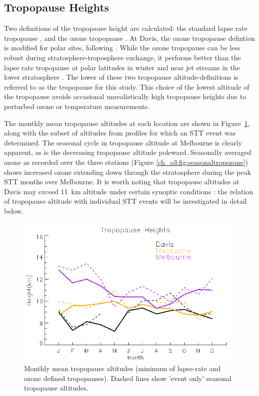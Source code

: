   \subsection{Tropopause Heights}
    Two definitions of the tropopause height are calculated: the standard lapse rate tropopause \citep{WMO1957}, and the ozone tropopause \citep{Bethan1996}.
    At Davis, the ozone tropopause defintion is modified for polar sites, following \citet{Tomikawa2009,Alexander2013}. 
    While the ozone tropopause can be less robust during stratosphere-troposphere exchange, it performs better than the lapse rate tropopause at polar latitudes in winter and near jet streams in the lower stratosphere \citep{Bethan1996}. The lower of these two tropopause altitude-definitions is referred to as the tropopause for this study.
    This choice of the lowest altitude of the tropopause avoids occasional unrealistically high tropopause heights due to perturbed ozone or temperature measurements.

    The monthly mean tropopause altitudes at each location are shown in Figure~\ref{ch_o3:fig:seasonaltpheights}, along with the subset of altitudes from profiles for which an STT event was determined. 
    The seasonal cycle in tropopause altitude at Melbourne is clearly apparent, as is the decreasing tropopause altitude poleward. 
    Seasonally averaged ozone as recorded over the three stations (Figure \ref{ch_o3:fig:seasonaltropozone}) shows increased ozone extending down through the stratosphere during the peak STT months over Melbourne.
    It is worth noting that tropopause altitudes at Davis may exceed 11~km altitude under certain synoptic conditions \citep{Alexander2013}: the relation of tropopause altitude with individual STT events will be investigated in detail below.

    \begin{figure}\begin{center}
      \includegraphics[width=0.8\columnwidth]{Figures/Ozone/tpheights}
      \caption{
	Monthly mean tropopause altitudes (minimum of lapse-rate and ozone defined tropopauses). Dashed lines show 'event only' seasonal tropopause altitudes.%
      }
      \label{ch_o3:fig:seasonaltpheights}
    \end{center}\end{figure}

